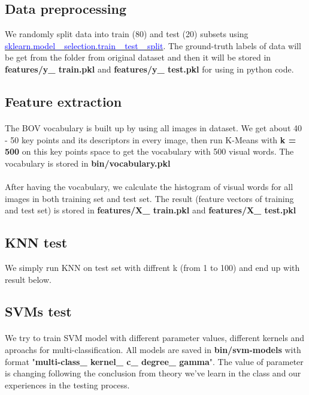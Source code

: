 \subsection{Data preprocessing}
We randomly split data into train (80) and test (20) subsets using \href{http://scikit-learn.org/stable/modules/classes.html}{\textcolor{blue}{sklearn.model\_ selection.train\_ test\_ split}}. The ground-truth labels of data will be get from the folder from original dataset and then it will be stored in \textbf{features/y\_ train.pkl} and \textbf{features/y\_ test.pkl} for using in python code.

\subsection{Feature extraction}
\paragraph*{}
The BOV vocabulary is built up by using all images in dataset. We get about 40 - 50 key points and its descriptors in every image, then run K-Means with \textbf{k = 500} on this key points space to get the vocabulary with 500 visual words. The vocabulary is stored in \textbf{bin/vocabulary.pkl }

\paragraph*{}
After having the vocabulary, we calculate the histogram of visual words for all images in both training set and test set. The result (feature vectors of training and test set) is stored in \textbf{features/X\_ train.pkl} and \textbf{features/X\_ test.pkl}

\subsection{KNN test}
We simply run KNN on test set with diffrent k (from 1 to 100) and end up with result below.

\subsection{SVMs test}
\paragraph*{}
We try to train SVM model with different parameter values, different kernels and aproachs for multi-classification. All models are saved in \textbf{bin/svm-models} with format "\textbf{multi-class\_ kernel\_ c\_ degree\_ gamma}". The value of parameter is changing following the conclusion from theory we've learn in the class and our experiences in the testing process. 
